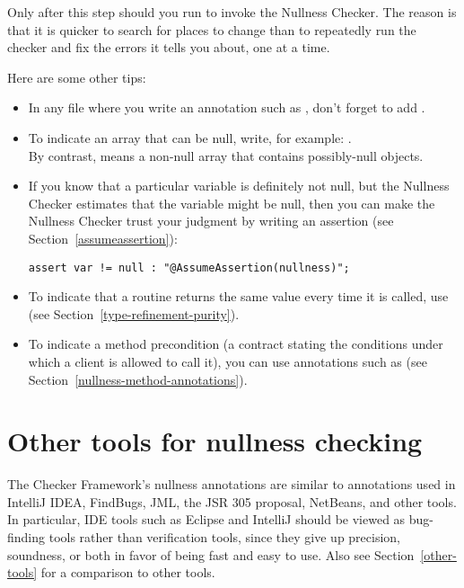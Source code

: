 Only after this step should you run  to invoke
the Nullness Checker.  The reason is that it is quicker to search for
places to change than to repeatedly run the checker and fix the errors it
tells you about, one at a time.

Here are some other tips:
\begin{itemize}
\item
    \begin{sloppypar}
    In any file where you write an annotation such as ,
    don't forget to add .
    \end{sloppypar}
\item
    To indicate an array that can be null, write, for example: . \\
    By contrast,  means a non-null array that
    contains possibly-null objects.
\item
    If you know that a particular variable is definitely not null, but the
    Nullness Checker estimates that the variable might be null, then you can
    make the Nullness Checker trust your judgment by writing
    an assertion (see Section~\ref{assumeassertion}):
\begin{Verbatim}
assert var != null : "@AssumeAssertion(nullness)";
\end{Verbatim}
\item
    To indicate that a routine returns the same value every time it is
    called, use  (see Section~\ref{type-refinement-purity}).
\item
    To indicate a method precondition (a contract stating the conditions
    under which a client is allowed to call it), you can use annotations
    such as  (see Section~\ref{nullness-method-annotations}).
\end{itemize}



\section{Other tools for nullness checking\label{nullness-related-work}}

\newcommand{\linktoNonNull}{\refclass{checker/nullness/qual}{NonNull}}
\newcommand{\linktoNullable}{\refclass{checker/nullness/qual}{Nullable}}

The Checker Framework's nullness annotations are similar to annotations used
in IntelliJ IDEA, FindBugs, JML, the JSR 305 proposal, NetBeans, and other
tools.  In particular, IDE tools such as Eclipse and IntelliJ should be
viewed as bug-finding tools rather than verification tools, since they
give up precision, soundness, or both in favor of being fast and
easy to use.  Also
see Section~\ref{other-tools} for a comparison to other tools.


